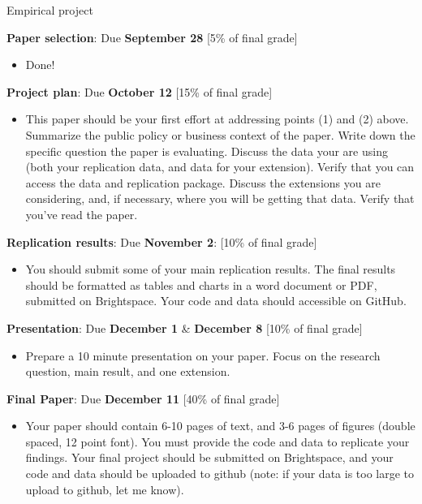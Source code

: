 \documentclass[compress, 8pt]{beamer}
\begin{document}
\begin{frame}{Empirical project}

\textbf{Paper selection}: Due \textbf{September 28} [5\% of final grade]
\begin{itemize}
    \item Done!
\end{itemize}

\textbf{Project plan}: Due \textbf{October 12} [15\% of final grade] 
\begin{itemize}
\item This paper should be your first effort at addressing points (1) and (2) above.
Summarize the public policy or business context of the paper. Write down the
specific question the paper is evaluating. Discuss the data your are using (both your replication data, and data for your extension). Verify that you can access the data and replication package. Discuss the extensions you are considering, and, if necessary, where you will be getting that data. Verify that you’ve read the paper.
\end{itemize} 

\textbf{Replication results}: Due \textbf{November 2}: [10\% of final grade]
\begin{itemize}
\item You should submit some of your main replication results. The final results should be formatted as tables and charts in a word document or PDF, submitted on Brightspace. Your code and data should accessible on GitHub.
\end{itemize}

\textbf{Presentation}: Due \textbf{December 1} \& \textbf{December 8} [10\% of final grade]
\begin{itemize}
\item Prepare a 10 minute presentation on your paper. Focus on the research question, main result, and one extension. 
\end{itemize}

\textbf{Final Paper}: Due \textbf{December 11} [40\% of final grade]
\begin{itemize}
\item Your paper should contain 6-10 pages of text, and 3-6 pages of figures (double spaced, 12 point font).
You must provide the code and data to replicate your findings. 
Your final project should be submitted on Brightspace, and your code and data should be uploaded to github (note: if your data is too large to upload to github, let me know). 
\end{itemize}

\end{frame}
\end{document}
